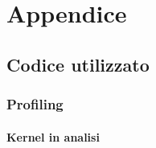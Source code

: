 
\chapter{Appendice}
\label{cap:appendix}

\section{Codice utilizzato}

\subsection{Profiling}

\subsubsection{Kernel in analisi}

